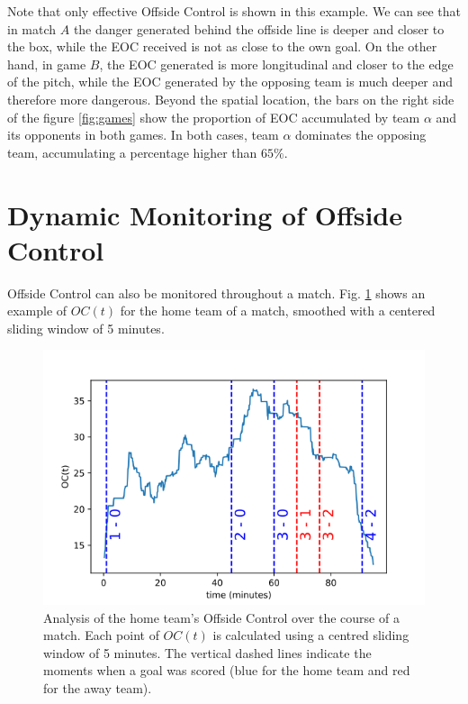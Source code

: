 \documentclass[
  10pt,
  twoside,nohyper]{book}
\begin{document}
Note that only effective Offside Control is shown in this example. We can see that in match \(A\) the danger generated behind the offside line is deeper and closer to the box, while the EOC received is not as close to the own goal. On the other hand, in game \(B\), the EOC generated is more longitudinal and closer to the edge of the pitch, while the EOC generated by the opposing team is much deeper and therefore more dangerous. Beyond the spatial location, the bars on the right side of the figure \ref{fig:games} show the proportion of EOC accumulated by team \(\alpha\) and its opponents in both games. In both cases, team \(\alpha\) dominates the opposing team, accumulating a percentage higher than \(65\%\).

\pagebreak

\section{Dynamic Monitoring of Offside Control}\label{dynamic-monitoring-of-offside-control}

Offside Control can also be monitored throughout a match. Fig. \ref{fig:oct} shows an example of \(OC(t)\) for the home team of a match, smoothed with a centered sliding window of 5 minutes.

\begin{figure}[H]

{\centering \includegraphics[width=0.8\linewidth,]{imagenes/cumulative_OC_evolution} 

}

\caption{Analysis of the home team's Offside Control over the course of a match. Each point of $OC(t)$ is calculated using a centred sliding window of 5 minutes. The vertical dashed lines indicate the moments when a goal was scored (blue for the home team and red for the away team).}\label{fig:oct}
\end{figure}
\end{document}
